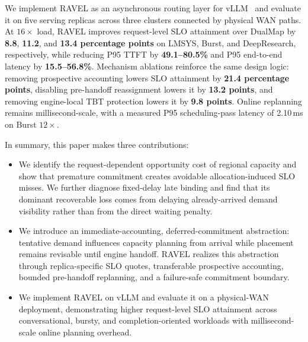 We implement RAVEL as an asynchronous routing layer for vLLM~\cite{vllm} and
evaluate it on five serving replicas across three clusters connected by
physical WAN paths.
At $16\times$ load, RAVEL improves request-level SLO attainment over DualMap by
\textbf{8.8}, \textbf{11.2}, and \textbf{13.4 percentage points} on LMSYS,
Burst, and DeepResearch, respectively, while reducing P95 TTFT by
\textbf{49.1--80.5\%} and P95 end-to-end latency by
\textbf{15.5--56.8\%}.
Mechanism ablations reinforce the same design logic: removing prospective
accounting lowers SLO attainment by \textbf{21.4 percentage points}, disabling
pre-handoff reassignment lowers it by \textbf{13.2 points}, and removing
engine-local TBT protection lowers it by \textbf{9.8 points}.
Online replanning remains millisecond-scale, with a measured P95
scheduling-pass latency of 2.10\,ms on Burst $12\times$.

In summary, this paper makes three contributions:
\begin{itemize}
    \item
    We identify the request-dependent opportunity cost of regional capacity and
    show that premature commitment creates avoidable allocation-induced SLO
    misses.
    We further diagnose fixed-delay late binding and find that its dominant
    recoverable loss comes from delaying already-arrived demand visibility
    rather than from the direct waiting penalty.

    \item
    We introduce an immediate-accounting, deferred-commitment abstraction:
    tentative demand influences capacity planning from arrival while placement
    remains revisable until engine handoff.
    RAVEL realizes this abstraction through replica-specific SLO quotes,
    transferable prospective accounting, bounded pre-handoff replanning, and a
    failure-safe commitment boundary.

    \item
    We implement RAVEL on vLLM and evaluate it on a physical-WAN deployment,
    demonstrating higher request-level SLO attainment across conversational,
    bursty, and completion-oriented workloads with millisecond-scale online
    planning overhead.
\end{itemize}
